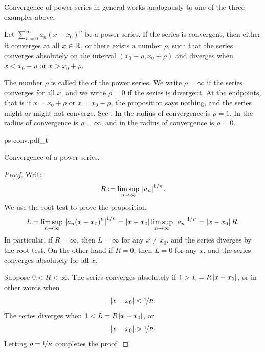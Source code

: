 Convergence of power series in general works analogously to
one of the three examples above.

\begin{prop} \label{prop:powerserrealradius}
Let $\sum_{n=0}^\infty a_n {(x-x_0)}^n$ be a power series.
If the series is convergent, then either it converges at
all $x \in {\mathbb{R}}$, or
there exists a number $\rho$, such that
the series converges absolutely on the interval
$(x_0-\rho,x_0+\rho)$ and diverges when $x < x_0-\rho$ or $x > x_0+\rho$.
\end{prop}

The number $\rho$ is called the \emph{} of the
power series.  We write $\rho = \infty$ if the series converges for
all $x$, and we write $\rho = 0$ if the series is divergent.
At the endpoints, that is if $x = x_0+\rho$ or $x = x_0-\rho$,
the proposition says nothing,
and the series might or might not converge.
See .
In 
the radius of convergence is $\rho=1$.
In  the radius of convergence is $\rho=\infty$,
and in  the radius of convergence is $\rho=0$.

\begin{myfigureht}
{ps-conv.pdf_t}
\caption{Convergence of a power series.\label{ps:convfig}}
\end{myfigureht}

\begin{proof}
Write
\begin{equation*}
R := \limsup_{n\to\infty} \, {\left\lvert {a_n} \right\rvert}^{1/n} .
\end{equation*}
We use the root test to prove the proposition:
\begin{equation*}
L = \limsup_{n\to\infty} \, {\left\lvert {a_n {(x-x_0)}^n} \right\rvert}^{1/n} 
=
\left\lvert {x-x_0} \right\rvert \limsup_{n\to\infty} \, {\left\lvert {a_n} \right\rvert}^{1/n}
=
\left\lvert {x-x_0} \right\rvert R .
\end{equation*}
In particular, if $R = \infty$, then $L=\infty$ for any $x \not= x_0$, and
the series diverges by the root test.  On the
other hand if $R = 0$, then $L=0$ for any $x$, and the series 
converges absolutely for all $x$.

Suppose $0 < R < \infty$.
The series
converges absolutely if
$1 > L = R \left\lvert {x-x_0} \right\rvert$,
or in other words when
\begin{equation*}
\left\lvert {x-x_0} \right\rvert < \nicefrac{1}{R} .
\end{equation*}
The series diverges when
$1 < L = R \left\lvert {x-x_0} \right\rvert$,
or
\begin{equation*}
\left\lvert {x-x_0} \right\rvert > \nicefrac{1}{R} .
\end{equation*}
Letting $\rho = \nicefrac{1}{R}$ completes the proof.
\end{proof}

